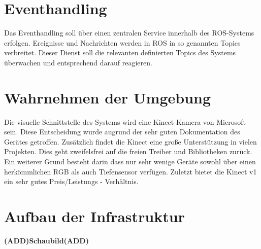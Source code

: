 	\section{Eventhandling}
	Das Eventhandling soll über einen zentralen Service innerhalb des ROS-Systems erfolgen. Ereignisse und Nachrichten werden in ROS in so genannten Topics verbreitet. Dieser Dienst soll die relevanten definierten Topics des Systems überwachen und entsprechend darauf reagieren.

	\section{Wahrnehmen der Umgebung}
	Die visuelle Schnittstelle des Systems wird eine Kinect Kamera von Microsoft sein. Diese Entscheidung wurde augrund der sehr guten Dokumentation des Gerätes getroffen. Zusätzlich findet die Kinect eine große Unterstützung in vielen Projekten. Dies geht zweifelsfrei auf die freien Treiber und Bibliotheken zurück. Ein weiterer Grund besteht darin dass nur sehr wenige Geräte sowohl über einen herkömmlichen RGB als auch Tiefensensor verfügen. Zuletzt bietet die Kinect v1 ein sehr gutes Preis/Leistungs - Verhältnis.
	
	\section{Aufbau der Infrastruktur}
	\textbf{(ADD)Schaubild(ADD)}